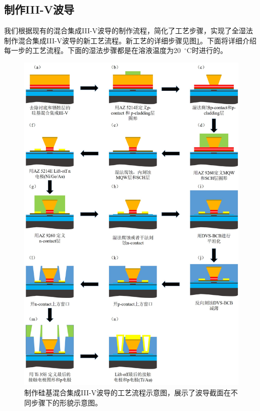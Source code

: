 \subsection{制作III-V波导}
我们根据现有的混合集成III-V波导的制作流程\cite{roelkens2015iii}，简化了工艺步骤，实现了全湿法制作混合集成III-V波导的新工艺流程。新工艺的详细步骤见图\ref{chapt4_III_V_wg_process}。下面将详细介绍每一步的工艺流程。下面的湿法步骤都是在溶液温度为20~$^{\circ}$C时进行的。
\begin{figure}[!h]
	\centering
	\includegraphics[width=14cm]{./Pictures/chapt4_III_V_wg_process.jpg}
	\caption{制作硅基混合集成III-V波导的工艺流程示意图，展示了波导截面在不同步骤下的形貌示意图。}
	\label{chapt4_III_V_wg_process}
\end{figure}

